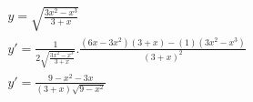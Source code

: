 \begin{ex}
\begin{align}
&y=\sqrt{\frac{3x^2-x^3}{3+x}}\nonumber\\
&y'=\frac{1}{2\sqrt{\frac{3x^2-x^3}{3+x}}}.\frac{(6x-3x^2)(3+x)-(1)(3x^2-x^3)}{(3+x)^2}\nonumber\\
&y'=\frac{9-x^2-3x}{(3+x)\sqrt{9-x^2}}\nonumber
\end{align}
\end{ex}